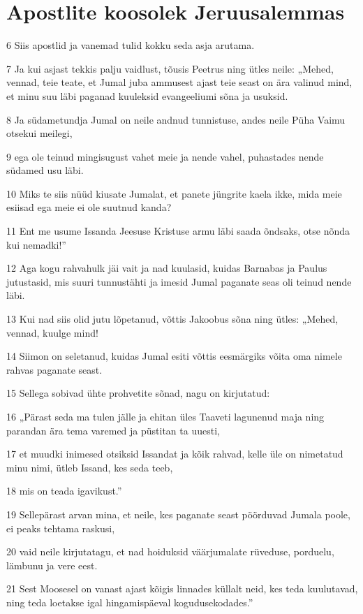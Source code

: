 \section*{Apostlite koosolek Jeruusalemmas}

\par 6 Siis apostlid ja vanemad tulid kokku seda asja arutama.
\par 7 Ja kui asjast tekkis palju vaidlust, tõusis Peetrus ning ütles neile: „Mehed, vennad, teie teate, et Jumal juba ammusest ajast teie seast on ära valinud mind, et minu suu läbi paganad kuuleksid evangeeliumi sõna ja usuksid.
\par 8 Ja südametundja Jumal on neile andnud tunnistuse, andes neile Püha Vaimu otsekui meilegi,
\par 9 ega ole teinud mingisugust vahet meie ja nende vahel, puhastades nende südamed usu läbi.
\par 10 Miks te siis nüüd kiusate Jumalat, et panete jüngrite kaela ikke, mida meie esiisad ega meie ei ole suutnud kanda?
\par 11 Ent me usume Issanda Jeesuse Kristuse armu läbi saada õndsaks, otse nõnda kui nemadki!”
\par 12 Aga kogu rahvahulk jäi vait ja nad kuulasid, kuidas Barnabas ja Paulus jutustasid, mis suuri tunnustähti ja imesid Jumal paganate seas oli teinud nende läbi.
\par 13 Kui nad siis olid jutu lõpetanud, võttis Jakoobus sõna ning ütles: „Mehed, vennad, kuulge mind!
\par 14 Siimon on seletanud, kuidas Jumal esiti võttis eesmärgiks võita oma nimele rahvas paganate seast.
\par 15 Sellega sobivad ühte prohvetite sõnad, nagu on kirjutatud:
\par 16 „Pärast seda ma tulen jälle ja ehitan üles Taaveti lagunenud maja ning parandan ära tema varemed ja püstitan ta uuesti,
\par 17 et muudki inimesed otsiksid Issandat ja kõik rahvad, kelle üle on nimetatud minu nimi, ütleb Issand, kes seda teeb,
\par 18 mis on teada igavikust.”
\par 19 Sellepärast arvan mina, et neile, kes paganate seast pöörduvad Jumala poole, ei peaks tehtama raskusi,
\par 20 vaid neile kirjutatagu, et nad hoiduksid väärjumalate rüveduse, porduelu, lämbunu ja vere eest.
\par 21 Sest Moosesel on vanast ajast kõigis linnades küllalt neid, kes teda kuulutavad, ning teda loetakse igal hingamispäeval kogudusekodades.”

